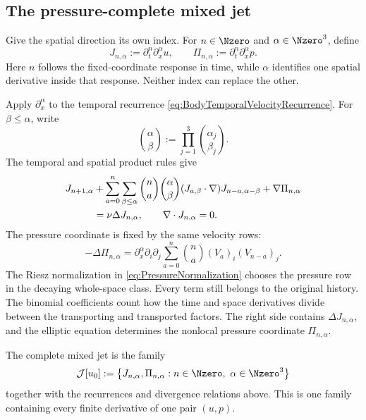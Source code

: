 \subsection{The pressure-complete mixed jet}\label{sub:ThePressureCompleteMixedDerivativeTower}

Give the spatial direction its own index.
For \(n\in\Nzero\) and \(\alpha\in\Nzero^3\), define
\begin{equation}\label{eq:BodyMixedJetDefinition}
  J_{n,\alpha}
  :=\partial_t^n\partial_x^\alpha u,
  \qquad
  \Pi_{n,\alpha}
  :=\partial_t^n\partial_x^\alpha p.
\end{equation}
Here \(n\) follows the fixed-coordinate response in time, while \(\alpha\) identifies one spatial derivative inside that response.
Neither index can replace the other.

Apply \(\partial_x^\alpha\) to the temporal recurrence \eqref{eq:BodyTemporalVelocityRecurrence}.
For \(\beta\leq\alpha\), write
\[
  \binom{\alpha}{\beta}
  :=\prod_{j=1}^3\binom{\alpha_j}{\beta_j}.
\]
The temporal and spatial product rules give
\begin{align}
  J_{n+1,\alpha}
  &+
  \sum_{a=0}^{n}
  \sum_{\beta\leq\alpha}
  \binom{n}{a}\binom{\alpha}{\beta}
  (J_{a,\beta}\cdot\nabla)
  J_{n-a,\alpha-\beta}
  +\nabla\Pi_{n,\alpha}
  \notag\\
  &=\nu\Delta J_{n,\alpha},
  \qquad
  \nabla\cdot J_{n,\alpha}=0.
  \label{eq:BodyMixedJetRecurrence}
\end{align}
The pressure coordinate is fixed by the same velocity rows:
\begin{equation}\label{eq:BodyMixedPressureRecurrence}
  -\Delta\Pi_{n,\alpha}
  =\partial_x^\alpha\partial_i\partial_j
  \sum_{a=0}^{n}\binom{n}{a}(V_a)_i(V_{n-a})_j.
\end{equation}
The Riesz normalization in \eqref{eq:PressureNormalization} chooses the pressure row in the decaying whole-space class.
Every term still belongs to the original history.
The binomial coefficients count how the time and space derivatives divide between the transporting and transported factors.
The right side contains \(\Delta J_{n,\alpha}\), and the elliptic equation determines the nonlocal pressure coordinate \(\Pi_{n,\alpha}\).

The complete mixed jet is the family
\[
  \mathcal J[u_0]
  :=\left\{
    J_{n,\alpha},\Pi_{n,\alpha}:
    n\in\Nzero,\ \alpha\in\Nzero^3
  \right\}
\]
together with the recurrences and divergence relations above.
This is one family containing every finite derivative of one pair \((u,p)\).

